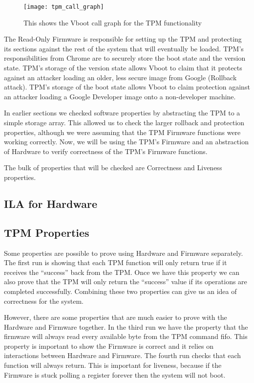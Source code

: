 \begin{figure}[!htbp]
  \centering
  \texttt{[image: tpm\_call\_graph]}
  \caption[TPM Call Graph]{This shows the Vboot call graph for the TPM functionality}\label{fig:tpm_call_graph}
\end{figure}

The Read-Only Firmware is responsible for setting up the TPM and protecting its
sections against the rest of the system that will eventually be loaded.
TPM's responsibilities from Chrome are to securely store the boot state and the
version state.
TPM's storage of the version state allows Vboot to claim that it protects against 
an attacker loading an older, less secure image from Google (Rollback attack).
TPM's storage of the boot state allows Vboot to claim protection against an attacker loading a Google Developer image onto a non-developer machine.

In earlier sections we checked software properties by abstracting the TPM to a simple storage array. 
This allowed us to check the larger rollback and protection properties, although we were assuming that the TPM Firmware functions were working correctly.
Now, we will be using the TPM's Firmware and an abstraction of Hardware to verify correctness of the TPM's Firmware functions.

The bulk of properties that will be checked are Correctness and Liveness properties. 


\subsection{ILA for Hardware}   

\subsection{TPM Properties}   

Some properties are possible to prove using Hardware and Firmware separately.
The first run is showing that each TPM function will only return true if it receives the ``success'' back from the TPM\@.
Once we have this property we can also prove that the TPM will only return the ``success'' value if its operations are completed successfully. 
Combining these two properties can give us an idea of correctness for the system.

However, there are some properties that are much easier to prove with the 
Hardware and Firmware together.
In the third run we have the property that the firmware will always read every available byte from the TPM command fifo.
This property is important to show the Firmware is correct and it relies on interactions between Hardware and Firmware.
The fourth run checks that each function will always return. 
This is important for liveness, because if the Firmware is stuck polling a register forever then the system will not boot.


